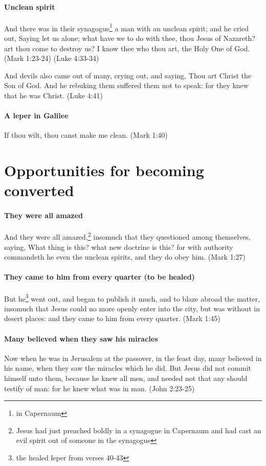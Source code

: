 \paragraph{Unclean spirit}
And there was in their synagogue\footnote{in Capernaum} a man with an unclean spirit; and he cried out, Saying let us alone; what have we to do with thee, thou Jesus of Nazareth? art thou come to destroy us? I know thee who thou art, the Holy One of God. (Mark 1:23-24) (Luke 4:33-34)

And devils also came out of many, crying out, and saying, Thou art Christ the Son of God. And he rebuking them suffered them not to speak: for they knew that he was Christ. (Luke 4:41)

\paragraph{A leper in Galilee}
If thou wilt, thou canst make me clean. (Mark 1:40)

\section{Opportunities for becoming converted}

\paragraph{They were all amazed}
And they were all amazed,\footnote{Jesus had just preached boldly in a synagogue in Capernaum and had cast an evil spirit out of someone in the synagogue} insomuch that they questioned among themselves, saying, What thing is this? what new doctrine is this? for with authority commandeth he even the unclean spirits, and they do obey him. (Mark 1:27)

\paragraph{They came to him from every quarter (to be healed)}
But he\footnote{the healed leper from verses 40-43} went out, and began to publish it much, and to blaze abroad the matter, insomuch that Jesus could no more openly enter into the city, but was without in desert places: and they came to him from every quarter. (Mark 1:45)

\paragraph{Many believed when they saw his miracles}
Now when he was in Jerusalem at the passover, in the feast day, many believed in his name, when they saw the miracles which he did. But Jesus did not commit himself unto them, because he knew all men, and needed not that any should testify of man: for he knew what was in man. (John 2:23-25)

